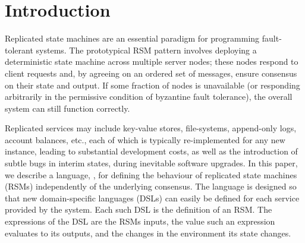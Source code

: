 \section{Introduction}
\label{s:introduction}







Replicated state machines are an essential paradigm for programming
fault-tolerant systems. The prototypical RSM pattern involves deploying a
deterministic state machine across multiple server nodes; these nodes respond
to client requests and, by agreeing on an ordered set of messages, ensure consensus
on their state and output. If some fraction of nodes is unavailable (or responding
arbitrarily in the permissive condition of byzantine fault tolerance), the overall
system can still function correctly.

Replicated services may include key-value stores, file-systems,
append-only logs, account balances, etc., each of which
is typically re-implemented for any new instance, leading to substantial development
costs, as well as the introduction of subtle bugs in interim states, during
inevitable software upgrades. In this paper, we describe a language, \rad{}, for
defining the behaviour of replicated state machines (RSMs) independently of the
underlying consensus. The language is designed so that new domain-specific
languages (DSLs) can easily be defined for each service provided by the system.
Each such DSL is the definition of an RSM. The expressions of the DSL
are the RSMs inputs, the value such an expression evaluates to its outputs, and
the changes in the environment its state changes.

